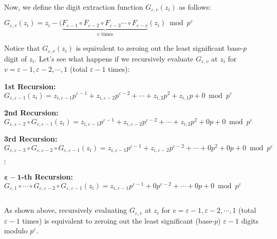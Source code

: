 $ $

Now, we define the digit extraction function $G_{\varepsilon, v}(z_i)$ as follows:

$G_{\varepsilon, v}(z_i) = z_i - (\underbrace{F_{\varepsilon-1}  \circ F_{\varepsilon-2}  \circ F_{\varepsilon-3}  \cdots \circ F_{\varepsilon-v}}_{v \text{ times}}(z_i) \bmod p^\varepsilon$


Notice that $G_{\varepsilon, v}(z_i)$ is equivalent to zeroing out the least significant base-$p$ digit of $z_i$. Let's see what happens if we recursively evaluate $G_{\varepsilon, v}$ at $z_i$ for $v =\varepsilon-1,\varepsilon-2, \cdots, 1$ (total $\varepsilon-1$ times):

\textbf{1st Recursion:} $G_{\varepsilon,\varepsilon-1}(z_i) = z_{i, \varepsilon-1}p^{\varepsilon-1} + z_{i, \varepsilon-2}p^{\varepsilon-2} + \cdots + z_{i, 2}p^2 + z_{i, 1}p + 0 \bmod p^\varepsilon$

\textbf{2nd Recursion:} $G_{\varepsilon,\varepsilon-2} \circ G_{\varepsilon,\varepsilon-1}(z_i) = z_{i, \varepsilon-1}p^{\varepsilon-1} + z_{i, \varepsilon-2}p^{\varepsilon-2} + \cdots + z_{i, 2}p^2 + 0p + 0 \bmod p^\varepsilon$

\textbf{3rd Recursion:} $G_{\varepsilon,\varepsilon-3} \circ G_{\varepsilon,\varepsilon-2} \circ G_{\varepsilon,\varepsilon-1}(z_i) = z_{i, \varepsilon-1}p^{\varepsilon-1} + z_{i, \varepsilon-2}p^{\varepsilon-2} + \cdots + 0p^2 + 0p + 0 \bmod p^\varepsilon$

$\vdots$

\textbf{$\bm{\varepsilon-1}$-th Recursion:} $G_{\varepsilon,1} \circ \cdots \circ G_{\varepsilon,\varepsilon-2} \circ G_{\varepsilon,\varepsilon-1}(z_i) = z_{i, \varepsilon-1}p^{\varepsilon-1} + 0p^{\varepsilon-2} + \cdots + 0p + 0 \bmod p^\varepsilon$

$ $

As shown above, recursively evaluating $G_{\varepsilon, v}$ at $z_i$ for $v = \varepsilon-1, \varepsilon-2, \cdots, 1$ (total $\varepsilon-1$ times) is equivalent to zeroing out the least significant (base-$p$) $\varepsilon-1$ digits modulo $p^\varepsilon$. 






